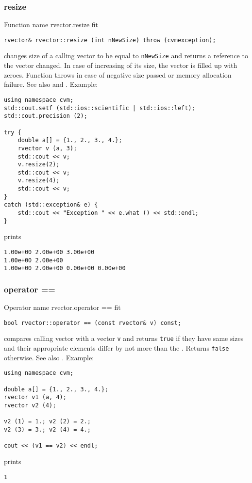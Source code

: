 \subsubsection{resize}
Function%
\pdfdest name {rvector.resize} fit
\begin{verbatim}
rvector& rvector::resize (int nNewSize) throw (cvmexception);
\end{verbatim}
changes size of a calling vector to be equal to
\verb"nNewSize" and returns a reference to
the vector changed.
In case of increasing of its size, the vector
is filled up with zeroes.
Function throws  
in case of negative size passed or memory allocation failure.
See also  and
.
Example:
\begin{Verbatim}
using namespace cvm;
std::cout.setf (std::ios::scientific | std::ios::left); 
std::cout.precision (2);

try {
    double a[] = {1., 2., 3., 4.};
    rvector v (a, 3);
    std::cout << v;
    v.resize(2);
    std::cout << v;
    v.resize(4);
    std::cout << v;
}
catch (std::exception& e) {
    std::cout << "Exception " << e.what () << std::endl;
}
\end{Verbatim}
prints
\begin{Verbatim}
1.00e+00 2.00e+00 3.00e+00
1.00e+00 2.00e+00
1.00e+00 2.00e+00 0.00e+00 0.00e+00
\end{Verbatim}
\newpage


\subsubsection{operator ==}
Operator%
\pdfdest name {rvector.operator ==} fit
\begin{verbatim}
bool rvector::operator == (const rvector& v) const;
\end{verbatim}
compares calling vector with a vector \verb"v"
and returns \verb"true" if they have same sizes
and their appropriate elements differ by not more than the
.
Returns \verb"false" otherwise.
See also .
Example:
\begin{Verbatim}
using namespace cvm;

double a[] = {1., 2., 3., 4.};
rvector v1 (a, 4);
rvector v2 (4);

v2 (1) = 1.; v2 (2) = 2.;
v2 (3) = 3.; v2 (4) = 4.;

cout << (v1 == v2) << endl;
\end{Verbatim}
prints
\begin{Verbatim}
1
\end{Verbatim}
\newpage




